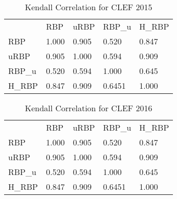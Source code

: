 

\begin{table}[]
\centering
\caption{Kendall Correlation for CLEF 2015}
\label{tab:kendall15}
\begin{tabular}{lllll}
       & RBP   & uRBP  & RBP\_u & H\_RBP \\
       RBP    & 1.000 & 0.905 & 0.520  & 0.847  \\
       uRBP   & 0.905 & 1.000 & 0.594  & 0.909  \\
       RBP\_u & 0.520 & 0.594 & 1.000  & 0.645  \\
       H\_RBP & 0.847 & 0.909 & 0.6451 & 1.000 
\end{tabular}
\end{table}


\begin{table}[]
\centering
\caption{Kendall Correlation for CLEF 2016}
\label{tab:kendall15}
\begin{tabular}{lllll}
       & RBP   & uRBP  & RBP\_u & H\_RBP \\
       RBP    & 1.000 & 0.905 & 0.520  & 0.847  \\
       uRBP   & 0.905 & 1.000 & 0.594  & 0.909  \\
       RBP\_u & 0.520 & 0.594 & 1.000  & 0.645  \\
       H\_RBP & 0.847 & 0.909 & 0.6451 & 1.000 
\end{tabular}
\end{table}


